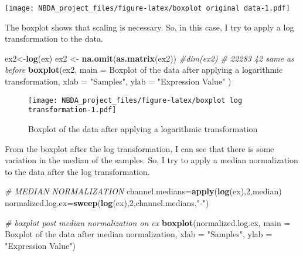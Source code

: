 \documentclass[
]{article}
\newenvironment{Shaded}{\begin{snugshade}}{\end{snugshade}}
\newcommand{\AttributeTok}[1]{\textcolor[rgb]{0.13,0.29,0.53}{#1}}
\newcommand{\CommentTok}[1]{\textcolor[rgb]{0.56,0.35,0.01}{\textit{#1}}}
\newcommand{\DecValTok}[1]{\textcolor[rgb]{0.00,0.00,0.81}{#1}}
\newcommand{\FunctionTok}[1]{\textcolor[rgb]{0.13,0.29,0.53}{\textbf{#1}}}
\newcommand{\NormalTok}[1]{#1}
\newcommand{\OtherTok}[1]{\textcolor[rgb]{0.56,0.35,0.01}{#1}}
\newcommand{\StringTok}[1]{\textcolor[rgb]{0.31,0.60,0.02}{#1}}
\begin{document}
\texttt{[image: NBDA\_project\_files/figure-latex/boxplot original data-1.pdf]}

The boxplot shows that scaling is necessary. So, in this case, I try to
apply a log transformation to the data.

\begin{Shaded}
\begin{Highlighting}[]
\NormalTok{ex2}\OtherTok{\textless{}{-}}\FunctionTok{log}\NormalTok{(ex)}
\NormalTok{ex2 }\OtherTok{\textless{}{-}} \FunctionTok{na.omit}\NormalTok{(}\FunctionTok{as.matrix}\NormalTok{(ex2))}
\CommentTok{\#dim(ex2) \# 22283    42 same as before}
\FunctionTok{boxplot}\NormalTok{(ex2, }\AttributeTok{main =} \StringTok{\textquotesingle{}Boxplot of the data after applying a logarithmic transformation\textquotesingle{}}\NormalTok{,}
        \AttributeTok{xlab =} \StringTok{"Samples"}\NormalTok{,}
        \AttributeTok{ylab =} \StringTok{"Expression Value"}
\NormalTok{        )}
\end{Highlighting}
\end{Shaded}

\begin{figure}
\centering
\texttt{[image: NBDA\_project\_files/figure-latex/boxplot log transformation-1.pdf]}
\caption{Boxplot of the data after applying a logarithmic
transformation}
\end{figure}

From the boxplot after the log transformation, I can see that there is
some variation in the median of the samples. So, I try to apply a median
normalization to the data after the log transformation.

\begin{Shaded}
\begin{Highlighting}[]
\CommentTok{\# MEDIAN NORMALIZATION}
\NormalTok{channel.medians}\OtherTok{=}\FunctionTok{apply}\NormalTok{(}\FunctionTok{log}\NormalTok{(ex),}\DecValTok{2}\NormalTok{,median)}
\NormalTok{normalized.log.ex}\OtherTok{=}\FunctionTok{sweep}\NormalTok{(}\FunctionTok{log}\NormalTok{(ex),}\DecValTok{2}\NormalTok{,channel.medians,}\StringTok{"{-}"}\NormalTok{)}

\CommentTok{\# boxplot post median normalization on ex}
\FunctionTok{boxplot}\NormalTok{(normalized.log.ex, }
        \AttributeTok{main =} \StringTok{\textquotesingle{}Boxplot of the data after median normalization\textquotesingle{}}\NormalTok{,}
        \AttributeTok{xlab =} \StringTok{"Samples"}\NormalTok{,}
        \AttributeTok{ylab =} \StringTok{"Expression Value"}\NormalTok{)}
\end{Highlighting}
\end{Shaded}
\end{document}
